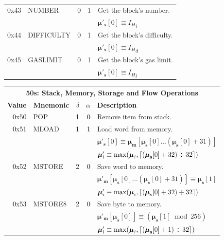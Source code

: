 \documentclass[9pt,oneside]{amsart}
\DeclarePairedDelimiter{\ceil}{\lceil}{\rceil}
\begin{document}
\begin{tabular*}{\columnwidth}[h]{rlrrl}
\midrule
0x43 & {\small NUMBER} & 0 & 1 & Get the block's number. \\
&&&& $\boldsymbol{\mu}'_\mathbf{s}[0] \equiv {I_H}_i$ \\
\midrule
0x44 & {\small DIFFICULTY} & 0 & 1 & Get the block's difficulty. \\
&&&& $\boldsymbol{\mu}'_\mathbf{s}[0] \equiv {I_H}_d$ \\
\midrule
0x45 & {\small GASLIMIT} & 0 & 1 & Get the block's gas limit. \\
&&&& $\boldsymbol{\mu}'_\mathbf{s}[0] \equiv {I_H}_l$ \\
\bottomrule
\end{tabular*}

\begin{tabular*}{\columnwidth}[h]{rlrrl}
\toprule
\multicolumn{5}{c}{\textbf{50s: Stack, Memory, Storage and Flow Operations}} \vspace{5pt} \\
\textbf{Value} & \textbf{Mnemonic} & $\delta$ & $\alpha$ & \textbf{Description} \vspace{5pt} \\
0x50 & {\small POP} & 1 & 0 & Remove item from stack. \\
\midrule
0x51 & {\small MLOAD} & 1 & 1 & Load word from memory. \\
&&&& $\boldsymbol{\mu}'_\mathbf{s}[0] \equiv \boldsymbol{\mu}_\mathbf{m}[\boldsymbol{\mu}_\mathbf{s}[0] \dots (\boldsymbol{\mu}_\mathbf{s}[0] + 31) ]$ \\
&&&& $\boldsymbol{\mu}'_i \equiv \max(\boldsymbol{\mu}_i, \ceil{ (\boldsymbol{\mu}_\mathbf{s}[0] + 32) \div 32 })$ \\
\midrule
0x52 & {\small MSTORE} & 2 & 0 & Save word to memory. \\
&&&& $\boldsymbol{\mu}'_\mathbf{m}[ \boldsymbol{\mu}_\mathbf{s}[0] \dots (\boldsymbol{\mu}_\mathbf{s}[0] + 31) ] \equiv \boldsymbol{\mu}_\mathbf{s}[1]$ \\
&&&& $\boldsymbol{\mu}'_i \equiv \max(\boldsymbol{\mu}_i, \ceil{ (\boldsymbol{\mu}_\mathbf{s}[0] + 32) \div 32 })$ \\
\midrule
0x53 & {\small MSTORE8} & 2 & 0 & Save byte to memory. \\
&&&& $\boldsymbol{\mu}'_\mathbf{m}[ \boldsymbol{\mu}_\mathbf{s}[0] ] \equiv (\boldsymbol{\mu}_\mathbf{s}[1] \bmod 256) $ \\
&&&& $\boldsymbol{\mu}'_i \equiv \max(\boldsymbol{\mu}_i, \ceil{ (\boldsymbol{\mu}_\mathbf{s}[0] + 1) \div 32 })$ \\

\end{tabular*}
\end{document}
